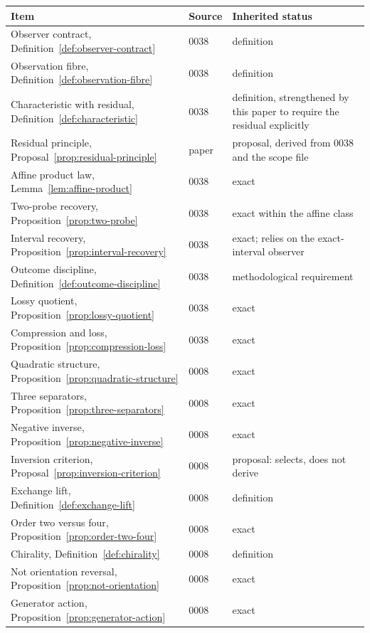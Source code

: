 \begin{longtable}{@{}p{}p{}p{}@{}}
\toprule
Item & Source & Inherited status \\
\midrule
\endhead
Observer contract, Definition~\ref{def:observer-contract} & 0038 & definition \\
Observation fibre, Definition~\ref{def:observation-fibre} & 0038 & definition \\
Characteristic with residual, Definition~\ref{def:characteristic} & 0038 & definition,
  strengthened by this paper to require the residual explicitly \\
Residual principle, Proposal~\ref{prop:residual-principle} & paper & proposal, derived from
  0038 and the scope file \\
Affine product law, Lemma~\ref{lem:affine-product} & 0038 & exact \\
Two-probe recovery, Proposition~\ref{prop:two-probe} & 0038 & exact within the affine class \\
Interval recovery, Proposition~\ref{prop:interval-recovery} & 0038 & exact; relies on the
  exact-interval observer \\
Outcome discipline, Definition~\ref{def:outcome-discipline} & 0038 & methodological
  requirement \\
Lossy quotient, Proposition~\ref{prop:lossy-quotient} & 0038 & exact \\
Compression and loss, Proposition~\ref{prop:compression-loss} & 0038 & exact \\
Quadratic structure, Proposition~\ref{prop:quadratic-structure} & 0008 & exact \\
Three separators, Proposition~\ref{prop:three-separators} & 0008 & exact \\
Negative inverse, Proposition~\ref{prop:negative-inverse} & 0008 & exact \\
Inversion criterion, Proposal~\ref{prop:inversion-criterion} & 0008 & proposal: selects,
  does not derive \\
Exchange lift, Definition~\ref{def:exchange-lift} & 0008 & definition \\
Order two versus four, Proposition~\ref{prop:order-two-four} & 0008 & exact \\
Chirality, Definition~\ref{def:chirality} & 0008 & definition \\
Not orientation reversal, Proposition~\ref{prop:not-orientation} & 0008 & exact \\
Generator action, Proposition~\ref{prop:generator-action} & 0008 & exact \\

\end{longtable}
